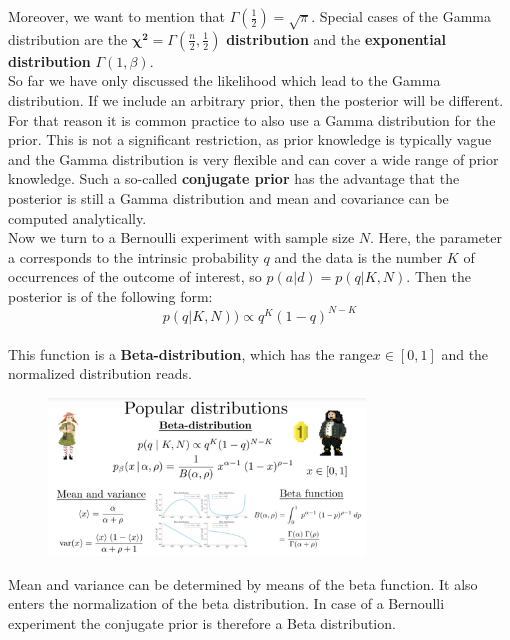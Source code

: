 \documentclass[12pt, a4paper]{scrartcl}
\begin{document}
Moreover, we want to mention that $\Gamma(\frac 12)=\sqrt{\pi}$.
Special cases of the Gamma distribution are the  $\mathbf{\chi^2}=\Gamma(\frac n2, \frac 12)$ \textbf{distribution} 
and the  \textbf{exponential distribution} $\Gamma(1, \beta)$.\\%

So far we have only discussed the likelihood which lead to the Gamma distribution. If we include an arbitrary prior, then the posterior will be different.
For that reason it is common practice to also use a Gamma distribution for
the prior. This is not a significant restriction, as prior knowledge is typically
vague and the Gamma distribution is very ﬂexible and can cover a wide range
of prior knowledge. Such a so-called  \textbf{conjugate prior} has the advantage that
the posterior is still a Gamma distribution and mean and covariance can be
computed analytically.\\


Now we turn to a Bernoulli experiment with sample size $N$. Here, the parameter a
corresponds to the intrinsic probability $q$ and the data is the number $K$ of
occurrences of the outcome of interest, so $p(a|d)=p(q|K,N)$. Then the posterior is of the following form:
\begin{equation*}\boxed{p(q|K,N))\propto q^K(1-q)^{N-K}
}\end{equation*}\\
This function is a  \textbf{Beta-distribution}, which has the range$x\in [0,1]$ and the
normalized distribution reads.%
 \begin{figure}[H]
	\centering
	\includegraphics[width=0.75\textwidth]{8_12.png}
\end{figure}
Mean and variance
can be determined by means of the beta function.
It also enters the normalization of the beta distribution.
In case of a Bernoulli experiment the conjugate prior is therefore a Beta
distribution.\\
\end{document}
